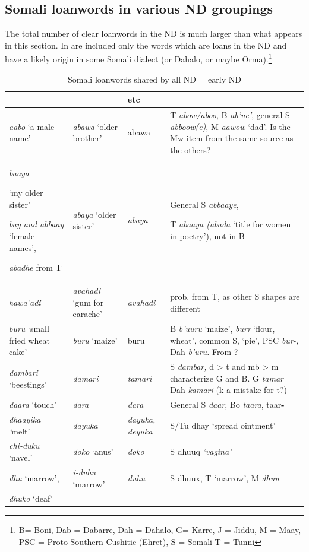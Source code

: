 \documentclass[output=paper
,newtxmath
,modfonts
,nonflat]{langsci/langscibook}
\begin{document}
\subsection{Somali loanwords in various ND groupings}\label{sec:nurse:5.4} The total number of clear loanwords in the ND is much larger than what appears in this section. In  are included only the words which are loans in the ND and have a likely origin in some Somali dialect (or Dahalo, or maybe Orma).\footnote{B= Boni, Dab = Dabarre, Dah = Dahalo, G= Karre, J = Jiddu, M = Maay, PSC = Proto-Southern Cushitic (Ehret), S = Somali T = Tunni}

\begin{table}
\footnotesize
\caption{Somali loanwords shared by all ND = early ND}
\label{tab:nurse:2}
\begin{tabularx}{\textwidth}{>{\raggedright}p{2.75cm}>{\raggedright}p{1.5cm}p{1.2cm}Q}
\lsptoprule
{} &  &  etc & \\
\midrule
\textit{aabo} ‘a male name’ & \textit{abawa} ‘older brother’ & abawa & T \textit{abow/aboo}, B \textit{ab’ue’}, general S \textit{abboow(e)}, M \textit{aawow} ‘dad’. Is the Mw item from the same source as the others?\\
\textit{baaya}

‘my older sister’

\textit{bay and abbaay} ‘female names’,

\textit{abadhe} from T & \textit{abaya} ‘older sister’ & \textit{abaya} & General S \textit{abbaaye},

T \textit{abaaya  (abada} ‘title for women in poetry’), not in B\\
\textit{hawa’adi}  & \textit{avahadi} ‘gum for earache’ & \textit{avahadi} & prob. from T, as other S shapes are different\\
\textit{buru} ‘small fried wheat cake’ & \textit{buru} ‘maize’ & buru & B \textit{b’uuru} ‘maize’,  \textit{burr} ‘flour, wheat’, common S,  ‘pie’, PSC \textit{bur}{}-, Dah \textit{b’uru.} From ?\\
\textit{dambari} ‘beestings’ & \textit{damari}\footnotemark{} & \textit{tamari} & S \textit{dambar,} d > t and mb > m characterize G and B. G \textit{tamar} Dah \textit{kamari} (k a mistake for t?)\footnotemark{}\\
\textit{daara} ‘touch’ & \textit{dara} & \textit{dara} & General S \textit{daar}, Bo \textit{taara},  taar\textbf{{}-} \\
\textit{dhaayika ‘}melt’ & \textit{dayuka} & \textit{dayuka, deyuka} & S/Tu dhay ‘spread ointment’\\
\textit{chi-d}\textit{uku} ‘navel’ & \textit{doko} ‘anus’ & \textit{doko} & S dhuuq \textit{‘vagina’}\\
\textit{dhu} ‘marrow’, & \textit{i-d}\textit{uhu} ‘marrow’ & \textit{duhu} & S dhuux, T ‘marrow’, M \textit{dhuu}\\
\textit{dhuko} ‘deaf’


\end{tabularx}
\end{table}
\end{document}
